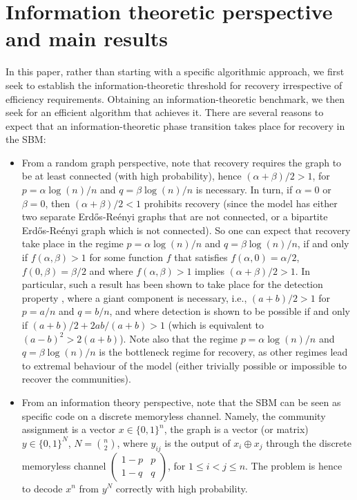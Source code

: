 \documentclass[english]{article}
\newcommand{\1}{\textbf{1}}
\begin{document}
\section{Information theoretic perspective and main results}
In this paper, rather than starting with a specific algorithmic approach,
we first seek to establish the information-theoretic threshold for recovery irrespective of efficiency requirements.
Obtaining an information-theoretic benchmark, we then seek for an efficient algorithm that achieves it.   
There are several reasons to expect that an information-theoretic phase transition takes place for recovery in the SBM:
\begin{itemize}
\item From a random graph perspective, note that recovery requires the graph to be at least connected (with high probability), hence $(\alpha+\beta)/2>1$, for $p=\alpha \log(n)/n$ and $q=\beta \log(n)/n$ is necessary. In turn, if $\alpha=0$ or $\beta=0$, then $(\alpha+\beta)/2<1$ prohibits recovery (since the model has either two separate Erd\H{o}s-Re\'enyi graphs that are not connected, or a bipartite Erd\H{o}s-Re\'enyi graph which is not connected). So one can expect that recovery take place in the regime $p=\alpha \log(n)/n$ and $q=\beta \log(n)/n$, if and only if $f(\alpha,\beta)>1$ for some function $f$ that satisfies $f(\alpha,0)=\alpha/2$, $f(0,\beta)=\beta/2$ and where $f(\alpha,\beta)>1$ implies $(\alpha+\beta)/2>1$. In particular, such a result has been shown to take place for the detection property  \cite{Massoulie_SBM,Mossel_SBM2}, where a giant component is necessary, i.e., $(a+b)/2 >1$ for $p=a/n$ and $q=b/n$, and where detection is shown to be possible if and only if $(a+b)/2 + 2ab/(a+b)>1$ (which is equivalent to $(a-b)^2 > 2(a+b)$).  
Note also that the regime $p=\alpha \log(n)/n$ and $q=\beta \log(n)/n$ is the bottleneck regime for recovery, as other regimes lead to extremal behaviour of the model (either trivially possible or impossible to recover the communities).  
 
\item From an information theory perspective, note that the SBM can be seen as specific code on a discrete memoryless channel. Namely, the community assignment is a vector $x \in \{0,1\}^n$,  the graph is a vector (or matrix) $y \in \{0,1\}^N$, $N={n \choose 2}$, where $y_{ij}$ is the output of $x_i \oplus x_j$ through the discrete memoryless channel $(\begin{smallmatrix} 1-p & p \\ 1-q & q \end{smallmatrix})$, for $1 \leq i<j \leq n$. The problem is hence to decode $x^n$ from $y^N$ correctly with high probability. 


\end{itemize}
\end{document}

